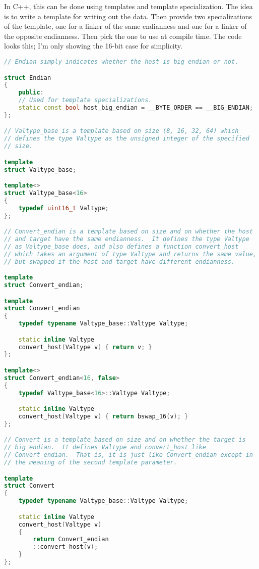 In C++, this can be done using templates and template specialization. The
idea is to write a template for writing out the data. Then provide two
specializations of the template, one for a linker of the same endianness
and one for a linker of the opposite endianness. Then pick the one to use
at compile time. The code looks this; I'm only showing the 16-bit case for
simplicity.

\begin{lstlisting}[language=C++]
// Endian simply indicates whether the host is big endian or not.

struct Endian
{
    public:
    // Used for template specializations.
    static const bool host_big_endian = __BYTE_ORDER == __BIG_ENDIAN;
};

// Valtype_base is a template based on size (8, 16, 32, 64) which
// defines the type Valtype as the unsigned integer of the specified
// size.

template
struct Valtype_base;

template<>
struct Valtype_base<16>
{
    typedef uint16_t Valtype;
};

// Convert_endian is a template based on size and on whether the host
// and target have the same endianness.  It defines the type Valtype
// as Valtype_base does, and also defines a function convert_host
// which takes an argument of type Valtype and returns the same value,
// but swapped if the host and target have different endianness.

template
struct Convert_endian;

template
struct Convert_endian
{
    typedef typename Valtype_base::Valtype Valtype;

    static inline Valtype
    convert_host(Valtype v) { return v; }
};

template<>
struct Convert_endian<16, false>
{
    typedef Valtype_base<16>::Valtype Valtype;

    static inline Valtype
    convert_host(Valtype v) { return bswap_16(v); }
};

// Convert is a template based on size and on whether the target is
// big endian.  It defines Valtype and convert_host like
// Convert_endian.  That is, it is just like Convert_endian except in
// the meaning of the second template parameter.

template
struct Convert
{
    typedef typename Valtype_base::Valtype Valtype;

    static inline Valtype
    convert_host(Valtype v)
    {
        return Convert_endian
        ::convert_host(v);
    }
};


\end{lstlisting}
